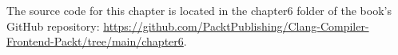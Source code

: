 
The source code for this chapter is located in the chapter6 folder of the book's GitHub repository: \url{https://github.com/PacktPublishing/Clang-Compiler-Frontend-Packt/tree/main/chapter6}.

